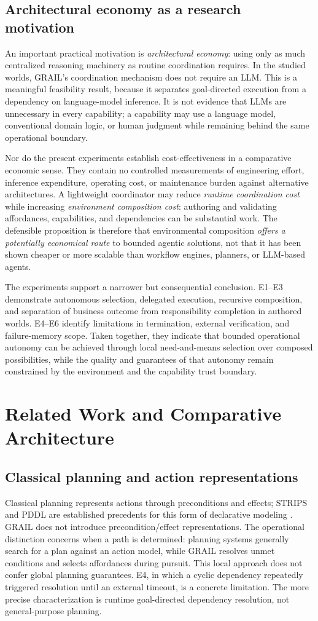 \documentclass[11pt]{article}
\begin{document}
\subsection{Architectural economy as a research motivation}
An important practical motivation is \emph{architectural economy}: using only as much centralized reasoning machinery as routine coordination requires. In the studied worlds, GRAIL's coordination mechanism does not require an LLM. This is a meaningful feasibility result, because it separates goal-directed execution from a dependency on language-model inference. It is not evidence that LLMs are unnecessary in every capability; a capability may use a language model, conventional domain logic, or human judgment while remaining behind the same operational boundary.

Nor do the present experiments establish cost-effectiveness in a comparative economic sense. They contain no controlled measurements of engineering effort, inference expenditure, operating cost, or maintenance burden against alternative architectures. A lightweight coordinator may reduce \emph{runtime coordination cost} while increasing \emph{environment composition cost}: authoring and validating affordances, capabilities, and dependencies can be substantial work. The defensible proposition is therefore that environmental composition \emph{offers a potentially economical route} to bounded agentic solutions, not that it has been shown cheaper or more scalable than workflow engines, planners, or LLM-based agents.

The experiments support a narrower but consequential conclusion. E1--E3 demonstrate autonomous selection, delegated execution, recursive composition, and separation of business outcome from responsibility completion in authored worlds. E4--E6 identify limitations in termination, external verification, and failure-memory scope. Taken together, they indicate that bounded operational autonomy can be achieved through local need-and-means selection over composed possibilities, while the quality and guarantees of that autonomy remain constrained by the environment and the capability trust boundary.
\section{Related Work and Comparative Architecture}
\subsection{Classical planning and action representations}
Classical planning represents actions through preconditions and effects; STRIPS and PDDL are established precedents for this form of declarative modeling \cite{FikesNilsson1971,McDermott1998}. GRAIL does not introduce precondition/effect representations. The operational distinction concerns when a path is determined: planning systems generally search for a plan against an action model, while GRAIL resolves unmet conditions and selects affordances during pursuit. This local approach does not confer global planning guarantees. E4, in which a cyclic dependency repeatedly triggered resolution until an external timeout, is a concrete limitation. The more precise characterization is runtime goal-directed dependency resolution, not general-purpose planning.
\end{document}

